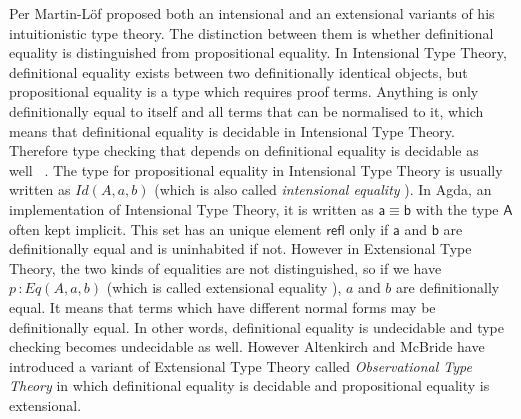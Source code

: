 \documentclass{article}
\newcommand{\Conid}[1]{\mathit{#1}}
\newcommand{\Varid}[1]{\mathit{#1}}
\renewcommand\Varid[1]{\mathord{\textsf{#1}}}
\let\Conid\Varid
\theoremstyle{definition}
\newcommand{\todo}[1]{\textcolor{red}{TO~DO:~#1}}
\newcommand{\itt}{Intensional Type Theory}
\newcommand{\ett}{Extensional Type Theory}
\begin{document}
Per Martin-L\"{o}f proposed both an intensional and an extensional
variants of his intuitionistic type theory. The distinction between them is whether definitional equality is distinguished from
propositional equality. In \itt{}, definitional equality exists
between two definitionally identical objects, but propositional
equality is a type which requires proof terms. Anything is only
definitionally equal to itself and all terms that can be normalised to
it, which means that definitional equality is decidable in
\itt{}.
Therefore type checking that depends on definitional equality is decidable as well~\cite{alt:99}
. 
The type for propositional equality in \itt{} is usually written as
$Id(A,a,b)$ (which is also called
\emph{intensional equality} \cite{nor:90}). 
In Agda\cite{norell:09}, an implementation of \itt{},  it is written
as \ensuremath{\Varid{a}\;\Varid{≡}\;\Varid{b}} with the type \ensuremath{\Conid{A}} often kept implicit. 
This set has an unique element \ensuremath{\Varid{refl}} only if \ensuremath{\Varid{a}} and \ensuremath{\Varid{b}} are
definitionally equal and is uninhabited if not. 
However in \ett{}, the two kinds of equalities are not distinguished, so if we have $p \,\colon Eq
(A,a,b)$ (which is called extensional equality \cite{nor:90}), $a$ and $b$ are
definitionally equal. 
It means that terms which have different normal forms may be definitionally equal. In other words, definitional equality is
undecidable and type checking becomes undecidable as well. However
Altenkirch and McBride have introduced a variant of \ett{} called
\emph{Observational Type Theory}  \cite{alt:06} in which definitional equality is
decidable and propositional equality is extensional.



\end{document}
